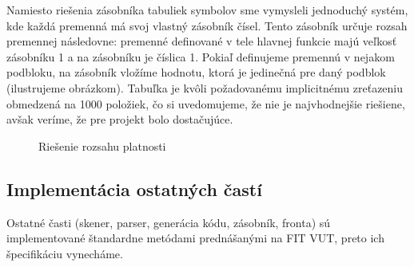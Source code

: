\documentclass[Slovak, a4paper, 12pt]{article}
\begin{document}
	 Namiesto riešenia zásobníka tabuliek symbolov sme vymysleli jednoduchý systém, kde každá premenná má svoj vlastný zásobník čísel. Tento zásobník určuje 
	 rozsah premennej následovne: premenné definované v tele hlavnej funkcie majú veľkosť zásobníku 1 a na zásobníku je číslica 1. Pokiaľ definujeme premennú v nejakom podbloku, na zásobník vložíme hodnotu, ktorá je jedinečná pre daný podblok (ilustrujeme obrázkom). Tabuľka je kvôli požadovanému implicitnému
	 zreťazeniu obmedzená na 1000 položiek, čo si uvedomujeme, že nie je najvhodnejšie riešiene, avšak veríme, že pre projekt bolo dostačujúce. 
	 \\
	\begin{figure}[ht]
		\begin{center}
			\caption{Riešenie rozsahu platnosti}
		\end{center}
	\end{figure}
	\newpage

	\subsection{Implementácia ostatných častí}
	Ostatné časti (skener, parser, generácia kódu, zásobník, fronta) sú implementované štandardne metódami prednášanými na FIT VUT, preto ich špecifikáciu
	vynecháme.  
	
\end{document}
